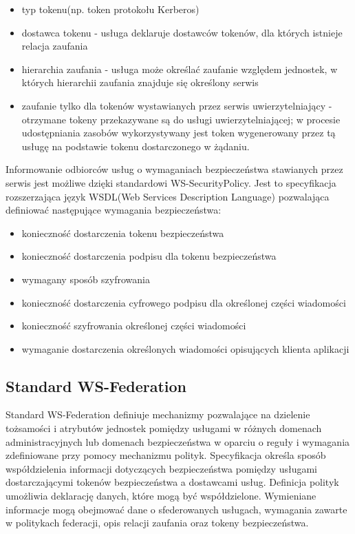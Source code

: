 		\begin{itemize}
			\item typ tokenu(np. token protokołu Kerberos)
			\item dostawca tokenu - usługa deklaruje dostawców tokenów, dla których istnieje relacja zaufania
			\item hierarchia zaufania - usługa może określać zaufanie względem jednostek, w których hierarchii zaufania znajduje się określony serwis
			\item zaufanie tylko dla tokenów wystawianych przez serwis uwierzytelniający - otrzymane tokeny przekazywane są do usługi uwierzytelniającej; w procesie udostępniania zasobów wykorzystywany jest token wygenerowany przez tą usługę na podstawie tokenu dostarczonego w żądaniu. 
		\end{itemize} 
		
	Informowanie odbiorców usług o wymaganiach bezpieczeństwa stawianych przez serwis jest możliwe dzięki standardowi WS-SecurityPolicy. Jest to specyfikacja rozszerzająca język WSDL(Web Services Description Language) pozwalająca definiować następujące wymagania bezpieczeństwa:

	\begin{itemize}
		\item konieczność dostarczenia tokenu bezpieczeństwa
		\item konieczność dostarczenia podpisu dla tokenu bezpieczeństwa
		\item wymagany sposób szyfrowania
		\item konieczność dostarczenia cyfrowego podpisu dla określonej części wiadomości
		\item konieczność szyfrowania określonej części wiadomości
		\item wymaganie dostarczenia określonych wiadomości opisujących klienta aplikacji
	\end{itemize} 

	\subsection{Standard WS-Federation}

		Standard WS-Federation definiuje mechanizmy pozwalające na dzielenie tożsamości i atrybutów jednostek pomiędzy usługami w różnych domenach administracyjnych lub domenach bezpieczeństwa w oparciu o reguły i wymagania zdefiniowane przy pomocy mechanizmu polityk\cite{Goodner09}. Specyfikacja określa sposób współdzielenia informacji dotyczących bezpieczeństwa pomiędzy usługami dostarczającymi tokenów bezpieczeństwa a dostawcami usług. Definicja polityk umożliwia deklarację danych, które mogą być współdzielone. Wymieniane informacje mogą obejmować dane o sfederowanych usługach, wymagania zawarte w politykach federacji, opis relacji zaufania oraz tokeny bezpieczeństwa.

